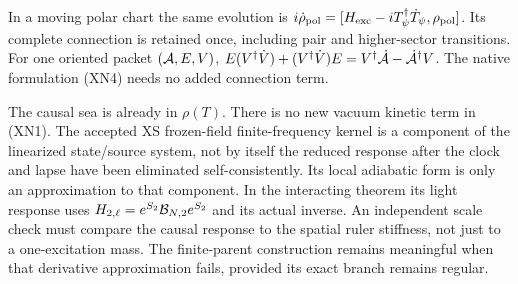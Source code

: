 \documentclass[11pt]{article}
\begin{document}
In a moving polar chart the same evolution is
$i\dot\rho_{\rm pol}=[H_{\rm exc}-iT_\psi^\dagger\dot T_\psi,
\rho_{\rm pol}]$.  Its complete connection is retained once,
including pair and higher-sector transitions.  For one oriented
packet $({\cal A},E,V)$,
$E(V^\dagger\dot V)+(V^\dagger\dot V)E
=V^\dagger\dot{\cal A}-\dot{\cal A}^\dagger V$.
The native formulation (XN4) needs no added connection term.

The causal sea is already in $\rho(T)$.  There is no new vacuum
kinetic term in (XN1).  The accepted XS frozen-field finite-frequency
kernel is a component of the linearized state/source system, not
by itself the reduced response after the clock and lapse have
been eliminated self-consistently.  Its local adiabatic form
is only an approximation to that component.  In the interacting theorem its
light response uses
$H_{2,\ell}=e^{S_2}{\cal B}_{N,2}e^{S_2}$ and its actual inverse.
An independent scale check must compare the causal response to the
spatial ruler stiffness, not just to a one-excitation mass.  The
finite-parent construction remains meaningful when that derivative
approximation fails, provided its exact branch remains regular.
\end{document}
